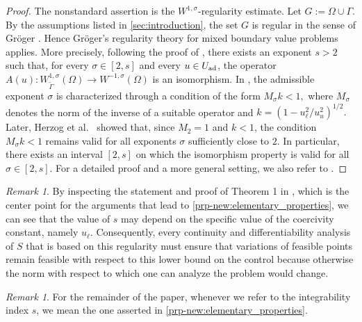 \documentclass[11pt]{article}
\theoremstyle{definition}
\theoremstyle{remark}
\newtheorem{remark}[theorem]{Remark}
\begin{document}
\begin{proof}
The nonstandard assertion is the $W^{1,\sigma}$-regularity estimate. Let $
G:=\Omega\cup\Gamma$. 
By the assumptions listed in  \cref{sec:introduction}, the set $G$ is regular in the sense of Gröger \cite[Definition 2]{groger1989aw}. Hence Gröger's regularity theory for mixed boundary value problems applies. More precisely, following the proof of \cite[Theorem~1 and Lemma~1]{groger1989aw}, there exists an exponent $s>2$ such that, for every $\sigma\in[2,s]$ and every $u\in U_{\rm ad}$, the operator
$A(u): W^{1,\sigma}_{\widetilde\Gamma}(\Omega)\to W^{-1,\sigma}(\Omega)
$
is an isomorphism. In \cite{groger1989aw}, the admissible exponent $\sigma$ is characterized through a  condition of the form
$
M_\sigma k<1,$ 
where $M_\sigma$ denotes the norm of the inverse of a suitable  operator and
$
k=\left(1-{u_\ell^2}/{u_u^2}\right)^{1/2}.
$ Later, Herzog et al.~\cite[Theorem~1.1]{herzog2011integrability} showed that, since $M_2=1$ and $k<1$, the condition $M_\sigma k<1$ remains valid for all exponents $\sigma$ sufficiently close to $2$. In particular, there exists an interval $[2,s]$ on which the isomorphism property is valid for all $\sigma \in [2,s]$. For a detailed proof and a more general setting, we also
refer to \cite[Theorem 1.1]{groger1989aw}. 
\end{proof}

\begin{remark}
By inspecting the statement and proof of Theorem 1 in \cite{groger1989aw}, 
which is the center point for the arguments that lead to 
\cref{prp-new:elementary_properties}, we can 
see that the value of $s$ may depend on the specific value of the coercivity
constant, namely $u_\ell$. Consequently, every continuity and
differentiability analysis of $S$ that is based on this regularity must 
ensure that variations of feasible points remain feasible with respect to 
this lower bound on the control because otherwise the norm with respect to which
one can analyze the problem would change.
\end{remark}
%
\begin{remark}\label{rem:index_s} For the remainder of the paper, whenever we refer to the integrability index $s$, we mean the one asserted in \cref{prp-new:elementary_properties}.
\end{remark}
%
\end{document}
